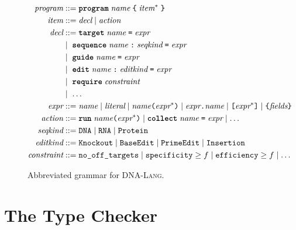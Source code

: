 \documentclass[12pt,a4paper]{article}
\newcommand{\DNALang}{\textsc{DNA-Lang}}
\newcommand{\ty}[1]{\texttt{#1}}
\newcommand{\kw}[1]{\textbf{\texttt{#1}}}
\begin{document}
\begin{figure}[H]
\centering
\begin{minipage}{0.95\textwidth}
\begin{align*}
\textit{program} &::= \kw{program}\; \textit{name}\; \texttt{\{}\; \textit{item}^*\; \texttt{\}} \\
\textit{item} &::= \textit{decl} \mid \textit{action} \\
\textit{decl} &::= \kw{target}\; \textit{name}\; \texttt{=}\; \textit{expr} \\
    &\mid\; \kw{sequence}\; \textit{name}\; \texttt{:}\; \textit{seqkind}\; \texttt{=}\; \textit{expr} \\
    &\mid\; \kw{guide}\; \textit{name}\; \texttt{=}\; \textit{expr} \\
    &\mid\; \kw{edit}\; \textit{name}\; \texttt{:}\; \textit{editkind}\; \texttt{=}\; \textit{expr} \\
    &\mid\; \kw{require}\; \textit{constraint} \\
    &\mid\; \ldots \\
\textit{expr} &::= \textit{name} \mid \textit{literal} \mid \textit{name}\texttt{(}\textit{expr}^{*}\texttt{)} \mid \textit{expr}\texttt{.}\textit{name} \mid \texttt{[}\textit{expr}^{*}\texttt{]} \mid \texttt{\{}\textit{fields}\texttt{\}} \\
\textit{action} &::= \kw{run}\; \textit{name}\texttt{(}\textit{expr}^{*}\texttt{)} \mid \kw{collect}\; \textit{name}\; \texttt{=}\; \textit{expr} \mid \ldots \\
\textit{seqkind} &::= \ty{DNA} \mid \ty{RNA} \mid \ty{Protein} \\
\textit{editkind} &::= \ty{Knockout} \mid \ty{BaseEdit} \mid \ty{PrimeEdit} \mid \ty{Insertion} \\
\textit{constraint} &::= \texttt{no\_off\_targets} \mid \texttt{specificity} \geq f \mid \texttt{efficiency} \geq f \mid \ldots
\end{align*}
\end{minipage}
\caption{Abbreviated grammar for \DNALang{}.}
\label{fig:grammar}
\end{figure}


\section{The Type Checker}
\label{sec:type-checker}
\end{document}
